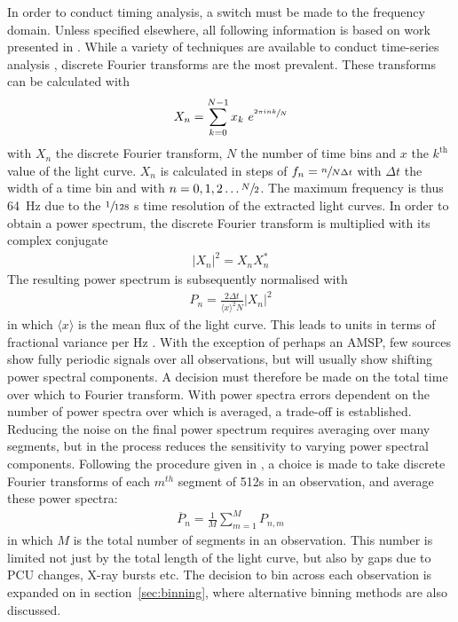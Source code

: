 In order to conduct timing analysis, a switch must be made to the frequency domain. Unless specified elsewhere, all following information is based on work presented in \citet{uttley2014x}. While a variety of techniques are available to conduct time-series analysis \citep[e.g.][]{maccarone2000time,legg2012direct}, discrete Fourier transforms are the most prevalent. These transforms can be calculated with
\begin{align} 
X_n = \sum^{N-1}_{k=0}x_k\ e^{\sfrac{2\pi ink}{N}}
\end{align}
with $X_n$ the discrete Fourier transform, $N$ the number of time bins and $x$ the $k^\textrm{th}$ value of the light curve. $X_n$ is calculated in steps of $f_n=\sfrac{n}{N\Delta t}$ with $\Delta t$ the width of a time bin and with $n=0,1,2\ldots \sfrac{N}{2}$. The maximum frequency is thus 64~Hz due to the $\sfrac{1}{128}\ $s time resolution of the extracted light curves. In order to obtain a power spectrum, the discrete Fourier transform is multiplied with its complex conjugate
\begin{align}
|X_n|^2 = X_n X_n^*
\end{align}
The resulting power spectrum is subsequently normalised with
\begin{align}
P_n = \frac{2\Delta t}{\langle x \rangle ^2 N}|X_n|^2
\end{align}
in which $\langle x \rangle$ is the mean flux of the light curve. This leads to units in terms of fractional variance per Hz \citep{belloni1990variability}. With the exception of perhaps an \ac{AMSP}, few sources show fully periodic signals over all observations, but will usually show shifting power spectral components. A decision must therefore be made on the total time over which to Fourier transform. With power spectra errors dependent on the number of power spectra over which is averaged, a trade-off is established. Reducing the noise on the final power spectrum requires averaging over many segments, but in the process reduces the sensitivity to varying power spectral components. Following the procedure given in \citet{heil2015power}, a choice is made to take discrete Fourier transforms of each $m^{th}$ segment of 512s in an observation, and average these power spectra:
\begin{align}
\overline{P}_n = \frac{1}{M} \sum_{m=1}^M P_{n,m}
\end{align}
in which $M$ is the total number of segments in an observation. This number is limited not just by the total length of the light curve, but also by gaps due to PCU changes, X-ray bursts etc. The decision to bin across each observation is expanded on in section~\ref{sec:binning}, where alternative binning methods are also discussed. \\
